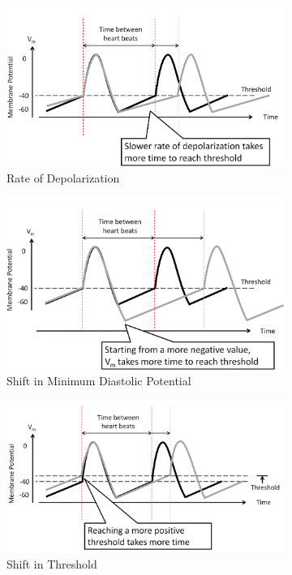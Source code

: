 \documentclass[11pt,fleqn]{book}
\begin{document}
\begin{figure}[h!]
    \centering
    \begin{subfigure}{0.45\textwidth}
        \includegraphics[width=\textwidth]{Pictures/Screenshot 2024-04-04 004646.png}
        \caption{Rate of Depolarization}
    \end{subfigure}
    \hfill
    \begin{subfigure}{0.45\textwidth}
        \includegraphics[width=\textwidth]{Pictures/Screenshot 2024-04-04 004728.png}
        \caption{Shift in Minimum Diastolic Potential}
    \end{subfigure}
    \begin{subfigure}{0.45\textwidth}
        \includegraphics[width=\textwidth]{Pictures/Screenshot 2024-04-04 004744.png}
        \caption{Shift in Threshold}
    \end{subfigure}
    \caption{}
\end{figure}
\end{document}
